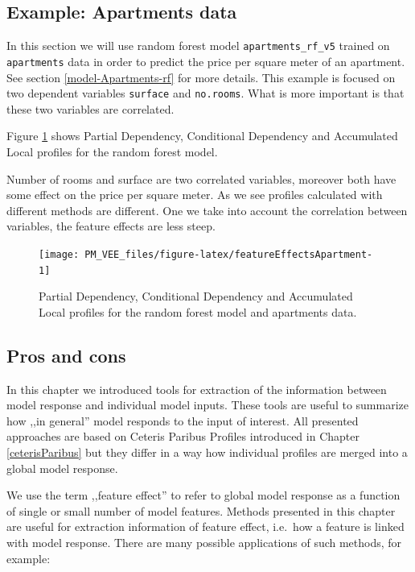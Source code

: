 \documentclass[12pt,]{krantz}
\begin{document}
\hypertarget{CDPExample}{%
\subsection{Example: Apartments data}\label{CDPExample}}

In this section we will use random forest model \texttt{apartments\_rf\_v5} trained on \texttt{apartments} data in order to predict the price per square meter of an apartment. See section \ref{model-Apartments-rf} for more details.
This example is focused on two dependent variables \texttt{surface} and \texttt{no.rooms}. What is more important is that these two variables are correlated.

Figure \ref{fig:featureEffectsApartment} shows Partial Dependency, Conditional Dependency and Accumulated Local profiles for the random forest model.

Number of rooms and surface are two correlated variables, moreover both have some effect on the price per square meter. As we see profiles calculated with different methods are different. One we take into account the correlation between variables, the feature effects are less steep.

\begin{figure}

{\centering \texttt{[image: PM\_VEE\_files/figure-latex/featureEffectsApartment-1]} 

}

\caption{Partial Dependency, Conditional Dependency and Accumulated Local profiles for the random forest model and apartments data.}\label{fig:featureEffectsApartment}
\end{figure}

\hypertarget{ALPProsCons}{%
\subsection{Pros and cons}\label{ALPProsCons}}

In this chapter we introduced tools for extraction of the information between model response and individual model inputs. These tools are useful to summarize how ,,in general'' model responds to the input of interest. All presented approaches are based on Ceteris Paribus Profiles introduced in Chapter \ref{ceterisParibus} but they differ in a way how individual profiles are merged into a global model response.

We use the term ,,feature effect'' to refer to global model response as a function of single or small number of model features.
Methods presented in this chapter are useful for extraction information of feature effect, i.e.~how a feature is linked with model response. There are many possible applications of such methods, for example:
\end{document}
